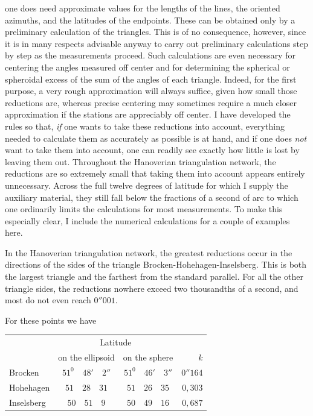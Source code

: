 %
one does need approximate values for the lengths of the lines, the oriented azimuths, and the latitudes of the endpoints. These can be obtained only by a preliminary calculation of the triangles. This is of no consequence, however, since it is in many respects advisable anyway to carry out preliminary calculations step by step as the measurements proceed. Such calculations are even necessary for centering the angles measured off center and for determining the spherical or spheroidal excess of the sum of the angles of each triangle. Indeed, for the first purpose, a very rough approximation will always suffice, given how small those reductions are, whereas precise centering may sometimes require a much closer approximation if the stations are appreciably off center. I have developed the rules so that, \textit{if} one wants to take these reductions into account, everything needed to calculate them as accurately as possible is at hand, and if one does \textit{not} want to take them into account, one can readily see exactly how little is lost by leaving them out. Throughout the Hanoverian triangulation network, the reductions are so extremely small that taking them into account appears entirely unnecessary. Across the full twelve degrees of latitude for which I supply the auxiliary material, they still fall below the fractions of a second of arc to which one ordinarily limits the calculations for most measurements. To make this especially clear, I include the numerical calculations for a couple of examples here.

In the Hanoverian triangulation network, the greatest reductions occur in the directions of the sides of the triangle Brocken-Hohehagen-Inselsberg. This is both the largest triangle and the farthest from the standard parallel. For all the other triangle sides, the reductions nowhere exceed two thousandths of a second, and most do not even reach \(0''001\).

For these points we have
\begin{center}
\begin{tabular}{l|c|c|r}
&\multicolumn{2}{c|}{Latitude}&\\
&on the ellipsoid&on the sphere&\(k\)\\\hline
Brocken&\(51^0\quad48'\quad2''\)&\(51^0\quad46'\quad3''\)&\(0''164\)\\
Hohehagen&\(51\quad28\quad31\)&\(51\quad26\quad35\)&\(0{,}303\)\\
Inselsberg&\(50\quad51\quad9\)&\(50\quad49\quad16\)&\(0{,}687\)
\end{tabular}
\end{center}
